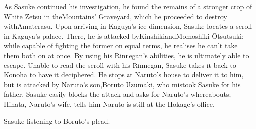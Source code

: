 \documentclass[a4paper,12pt]{article}
\begin{document}
As Sasuke continued his investigation, he found the remains of a stronger crop of White Zetsu in theMountains' Graveyard, which he proceeded to destroy withAmaterasu. Upon arriving in Kaguya's ice dimension, Sasuke locates a scroll in Kaguya's palace. There, he is attacked byKinshikiandMomoshiki Ōtsutsuki: while capable of fighting the former on equal terms, he realises he can't take them both on at once. By using his Rinnegan's abilities, he is ultimately able to escape. Unable to read the scroll with his Rinnegan, Sasuke takes it back to Konoha to have it deciphered. He stops at Naruto's house to deliver it to him, but is attacked by Naruto's son,Boruto Uzumaki, who mistook Sasuke for his father. Sasuke easily blocks the attack and asks for Naruto's whereabouts; Hinata, Naruto's wife, tells him Naruto is still at the Hokage's office.\\ \par \vspace{0.5cm}

Sasuke listening to Boruto's plead.\\ \par \vspace{0.5cm}
\end{document}
